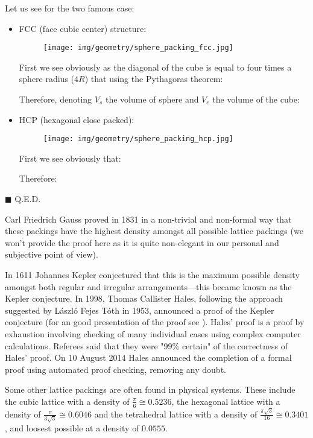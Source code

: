 {	\begin{dem}
	Let us see for the two famous case:
	\begin{itemize}
		\item FCC (face cubic center) structure:
		\begin{figure}[H]
			\centering
			\texttt{[image: img/geometry/sphere\_packing\_fcc.jpg]}
		\end{figure}
		First we see obviously as the diagonal of the cube is equal to four times a sphere radius ($4R$) that using the Pythagoras theorem:
		
		
		Therefore, denoting $V_s$ the volume of sphere and $V_e$ the volume of the cube:
		
	
		\item HCP (hexagonal close packed):
		\begin{figure}[H]
			\centering
			\texttt{[image: img/geometry/sphere\_packing\_hcp.jpg]}
		\end{figure}
		First we see obviously that:
		
		Therefore:
		
	\end{itemize}
	\begin{flushright}
		$\blacksquare$  Q.E.D.
	\end{flushright}
	\end{dem}
	Carl Friedrich Gauss proved in 1831 in a non-trivial and non-formal way that these packings have the highest density amongst all possible lattice packings (we won't provide the proof here as it is quite non-elegant in our personal and subjective point of view).
	
	In 1611 Johannes Kepler conjectured that this is the maximum possible density amongst both regular and irregular arrangements—this became known as the Kepler conjecture. In 1998, Thomas Callister Hales, following the approach suggested by László Fejes Tóth in 1953, announced a proof of the Kepler conjecture (for an good presentation of the proof see \cite{hales2005proof}). Hales' proof is a proof by exhaustion involving checking of many individual cases using complex computer calculations. Referees said that they were "$99\%$ certain" of the correctness of Hales' proof. On 10 August 2014 Hales announced the completion of a formal proof using automated proof checking, removing any doubt.
	
	\begin{tcolorbox}[title=Remark,colframe=black,arc=10pt]
	Some other lattice packings are often found in physical systems. These include the cubic lattice with a density of $\frac{\pi}{6} \cong 0.5236$, the hexagonal lattice with a density of $\frac{\pi}{3 \sqrt{3}} \cong 0.6046$ and the tetrahedral lattice with a density of $\frac{\pi \sqrt{3}}{16} \cong 0.3401$, and loosest possible at a density of $0.0555$.
	\end{tcolorbox}
	
}
